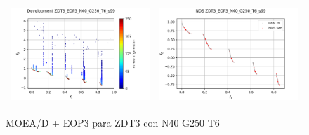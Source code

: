 \begin{figure}[H]
\begin{tabular}{c c}
    \includegraphics[scale=0.5]{figures/ZDT3_EOP3_N40_G250_T6/s99_dev.png} &
    \includegraphics[scale=0.5]{figures/ZDT3_EOP3_N40_G250_T6/s99_nds.png}\\
    \end{tabular}
    \caption{MOEA/D + EOP3 para ZDT3 con N40 G250 T6 }
    \label{fig:4}
\end{figure}


